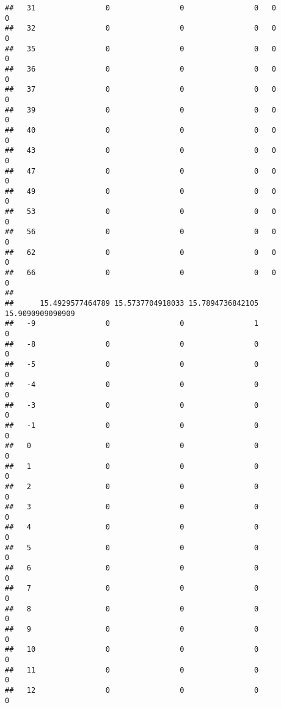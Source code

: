 \documentclass[]{article}
\begin{document}
\begin{verbatim}
##   31                0                0                0   0                0
##   32                0                0                0   0                0
##   35                0                0                0   0                0
##   36                0                0                0   0                0
##   37                0                0                0   0                0
##   39                0                0                0   0                0
##   40                0                0                0   0                0
##   43                0                0                0   0                0
##   47                0                0                0   0                0
##   49                0                0                0   0                0
##   53                0                0                0   0                0
##   56                0                0                0   0                0
##   62                0                0                0   0                0
##   66                0                0                0   0                0
##     
##      15.4929577464789 15.5737704918033 15.7894736842105 15.9090909090909
##   -9                0                0                1                0
##   -8                0                0                0                0
##   -5                0                0                0                0
##   -4                0                0                0                0
##   -3                0                0                0                0
##   -1                0                0                0                0
##   0                 0                0                0                0
##   1                 0                0                0                0
##   2                 0                0                0                0
##   3                 0                0                0                0
##   4                 0                0                0                0
##   5                 0                0                0                0
##   6                 0                0                0                0
##   7                 0                0                0                0
##   8                 0                0                0                0
##   9                 0                0                0                0
##   10                0                0                0                0
##   11                0                0                0                0
##   12                0                0                0                0

\end{verbatim}
\end{document}
